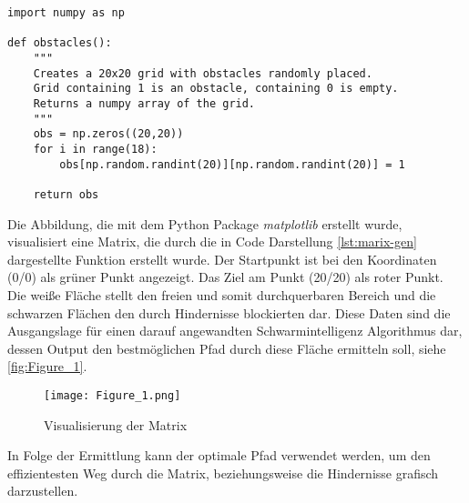 \begin{verbatim}
import numpy as np

def obstacles():
    """
    Creates a 20x20 grid with obstacles randomly placed.
    Grid containing 1 is an obstacle, containing 0 is empty.
    Returns a numpy array of the grid.
    """
    obs = np.zeros((20,20))
    for i in range(18):
        obs[np.random.randint(20)][np.random.randint(20)] = 1  
  
    return obs
\end{verbatim}
\vspace*{-3mm}
\vspace*{3mm}

Die Abbildung, die mit dem Python Package \textit{matplotlib} erstellt wurde, visualisiert eine Matrix, die durch die in Code Darstellung \autoref{lst:marix-gen} dargestellte Funktion erstellt wurde. Der Startpunkt ist bei den Koordinaten (0/0) als grüner Punkt angezeigt. Das Ziel am Punkt (20/20) als roter Punkt. Die weiße Fläche stellt den freien und somit durchquerbaren Bereich und die schwarzen Flächen den durch Hindernisse blockierten dar. Diese Daten sind die Ausgangslage für einen darauf angewandten Schwarmintelligenz Algorithmus dar, dessen Output den bestmöglichen Pfad durch diese Fläche ermitteln soll, siehe \autoref{fig:Figure_1}.
\begin{figure}[H]
    \centering
    \texttt{[image: Figure\_1.png]}
    \caption{Visualisierung der Matrix}
    \label{fig:Figure_1}
\end{figure}

In Folge der Ermittlung kann der optimale Pfad verwendet werden, um den effizientesten Weg durch die Matrix, beziehungsweise die Hindernisse grafisch darzustellen.


